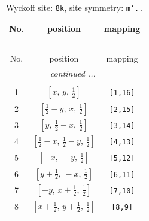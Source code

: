 \documentclass[fleqn,8pt]{jsarticle}
\begin{document}
\begin{longtable}{ccc}
\caption{Wyckoff site: {\tt 8k}, site symmetry: {\tt m'..}}
 \\
 \hline \hline
No. & position & mapping \\ \hline \endfirsthead

\multicolumn{2}{l}{\tablename\ \thetable{}} \\
 \hline \hline
No. & position & mapping \\ \hline \endhead

 \hline \hline
\multicolumn{2}{r}{\footnotesize\it continued ...} \\ \endfoot

 \hline \hline
\multicolumn{2}{r}{} \\ \endlastfoot

1 & $\left[ x,\, y,\, \frac{1}{2} \right]$ & {\tt [1,16]} \\ \hline
2 & $\left[ \frac{1}{2} - y,\, x,\, \frac{1}{2} \right]$ & {\tt [2,15]} \\ \hline
3 & $\left[ y,\, \frac{1}{2} - x,\, \frac{1}{2} \right]$ & {\tt [3,14]} \\ \hline
4 & $\left[ \frac{1}{2} - x,\, \frac{1}{2} - y,\, \frac{1}{2} \right]$ & {\tt [4,13]} \\ \hline
5 & $\left[ - x,\, - y,\, \frac{1}{2} \right]$ & {\tt [5,12]} \\ \hline
6 & $\left[ y + \frac{1}{2},\, - x,\, \frac{1}{2} \right]$ & {\tt [6,11]} \\ \hline
7 & $\left[ - y,\, x + \frac{1}{2},\, \frac{1}{2} \right]$ & {\tt [7,10]} \\ \hline
8 & $\left[ x + \frac{1}{2},\, y + \frac{1}{2},\, \frac{1}{2} \right]$ & {\tt [8,9]} \\
\end{longtable}
\renewcommand{\arraystretch}{1.2}
\end{document}
